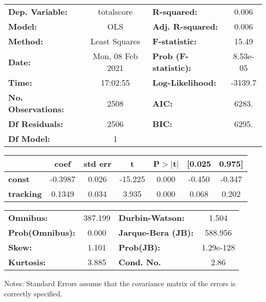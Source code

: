 \begin{center}
\begin{tabular}{lclc}
\toprule
\textbf{Dep. Variable:}    &    totalscore    & \textbf{  R-squared:         } &     0.006   \\
\textbf{Model:}            &       OLS        & \textbf{  Adj. R-squared:    } &     0.006   \\
\textbf{Method:}           &  Least Squares   & \textbf{  F-statistic:       } &     15.49   \\
\textbf{Date:}             & Mon, 08 Feb 2021 & \textbf{  Prob (F-statistic):} &  8.53e-05   \\
\textbf{Time:}             &     17:02:55     & \textbf{  Log-Likelihood:    } &   -3139.7   \\
\textbf{No. Observations:} &        2508      & \textbf{  AIC:               } &     6283.   \\
\textbf{Df Residuals:}     &        2506      & \textbf{  BIC:               } &     6295.   \\
\textbf{Df Model:}         &           1      & \textbf{                     } &             \\
\bottomrule
\end{tabular}
\begin{tabular}{lcccccc}
                  & \textbf{coef} & \textbf{std err} & \textbf{t} & \textbf{P$> |$t$|$} & \textbf{[0.025} & \textbf{0.975]}  \\
\midrule
\textbf{const}    &      -0.3987  &        0.026     &   -15.225  &         0.000        &       -0.450    &       -0.347     \\
\textbf{tracking} &       0.1349  &        0.034     &     3.935  &         0.000        &        0.068    &        0.202     \\
\bottomrule
\end{tabular}
\begin{tabular}{lclc}
\textbf{Omnibus:}       & 387.199 & \textbf{  Durbin-Watson:     } &     1.504  \\
\textbf{Prob(Omnibus):} &   0.000 & \textbf{  Jarque-Bera (JB):  } &   588.956  \\
\textbf{Skew:}          &   1.101 & \textbf{  Prob(JB):          } & 1.29e-128  \\
\textbf{Kurtosis:}      &   3.885 & \textbf{  Cond. No.          } &      2.86  \\
\bottomrule
\end{tabular}
\end{center}

Notes: \newline
 [1] Standard Errors assume that the covariance matrix of the errors is correctly specified.
